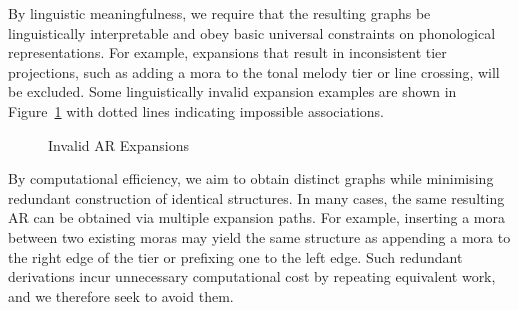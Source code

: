 \documentclass{CUP-JNL-PHO}%
\theoremstyle{definition}
\numberwithin{equation}{section}
\theoremstyle{definition}
\begin{document}
By linguistic meaningfulness, we require that the resulting graphs be
linguistically interpretable and obey basic universal constraints on
phonological representations. For example, expansions that result in
inconsistent tier projections, such as adding a mora to the tonal
melody tier or line crossing, will be excluded. Some linguistically
invalid expansion examples are shown in Figure~\ref{fig.invalid.AR}
with dotted lines indicating impossible associations.
\begin{figure}
	\centering
		 \hfil
		 \hfil
		\hfil
		
		\caption{Invalid AR Expansions}
	\label{fig.invalid.AR}
\end{figure}
By computational efficiency, we aim to obtain distinct graphs while
minimising redundant construction of identical structures. In many
cases, the same resulting AR can be obtained via multiple expansion
paths. For example, inserting a mora between two existing moras may
yield the same structure as appending a mora to the right edge of the
tier or prefixing one to the left edge. Such redundant derivations
incur unnecessary computational cost by repeating equivalent work, and
we therefore seek to avoid them.
\end{document}
